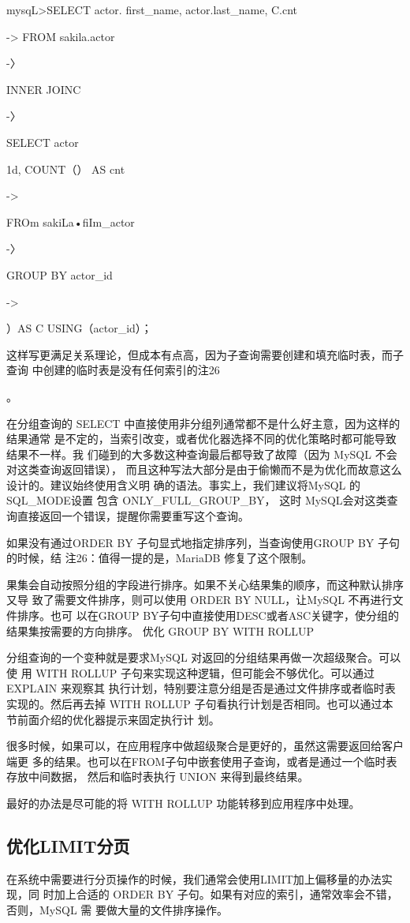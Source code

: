 mysqL>SELECT actor. first\_name, actor.last\_name, C.cnt

-> FROM sakila.actor

-〉

INNER JOINC

-〉

SELECT actor

1d, COUNT（） AS cnt

->

FROm sakiLa•fiIm\_actor

-〉

GROUP BY actor\_id

->

）AS C USING（actor\_id）；

这样写更满足关系理论，但成本有点高，因为子查询需要创建和填充临时表，而子查询
中创建的临时表是没有任何索引的注26

。

在分组查询的 SELECT 中直接使用非分组列通常都不是什么好主意，因为这样的结果通常
是不定的，当索引改变，或者优化器选择不同的优化策略时都可能导致结果不一样。我
们碰到的大多数这种查询最后都导致了故障（因为 MySQL 不会对这类查询返回错误），
而且这种写法大部分是由于偷懒而不是为优化而故意这么设计的。建议始终使用含义明
确的语法。事实上，我们建议将MySQL 的SQL\_MODE设置 包含 ONLY\_FULL\_GROUP\_BY，
这时 MySQL会对这类查询直接返回一个错误，提醒你需要重写这个查询。

如果没有通过ORDER BY 子句显式地指定排序列，当查询使用GROUP BY 子句的时候，结
注26：值得一提的是，MariaDB 修复了这个限制。

果集会自动按照分组的字段进行排序。如果不关心结果集的顺序，而这种默认排序又导
致了需要文件排序，则可以使用 ORDER BY NULL，让MySQL 不再进行文件排序。也可
以在GROUP BY子句中直接使用DESC或者ASC关键字，使分组的结果集按需要的方向排序。
优化 GROUP BY WITH ROLLUP

分组查询的一个变种就是要求MySQL 对返回的分组结果再做一次超级聚合。可以使
用 WITH ROLLUP 子句来实现这种逻辑，但可能会不够优化。可以通过EXPLAIN 来观察其
执行计划，特别要注意分组是否是通过文件排序或者临时表实现的。然后再去掉 WITH
ROLLUP 子句看执行计划是否相同。也可以通过本节前面介绍的优化器提示来固定执行计
划。

很多时候，如果可以，在应用程序中做超级聚合是更好的，虽然这需要返回给客户端更
多的结果。也可以在FROM子句中嵌套使用子查询，或者是通过一个临时表存放中间数据，
然后和临时表执行 UNION 来得到最终结果。

最好的办法是尽可能的将 WITH ROLLUP 功能转移到应用程序中处理。

\subsection{优化LIMIT分页}
在系统中需要进行分页操作的时候，我们通常会使用LIMIT加上偏移量的办法实现，同
时加上合适的 ORDER BY 子句。如果有对应的索引，通常效率会不错，否则，MySQL 需
要做大量的文件排序操作。

